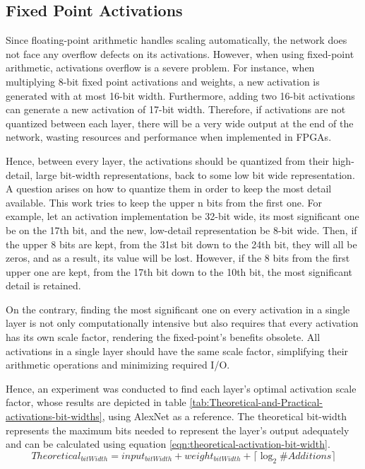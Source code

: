 \subsection{Fixed Point Activations}
\label{sec:Fixed-Point-Activations}
Since floating-point arithmetic handles scaling automatically, the network does not face any overflow defects on its activations. However, when using fixed-point arithmetic, activations overflow is a severe problem. For instance, when multiplying 8-bit fixed point activations and weights, a new activation is generated with at most 16-bit width. Furthermore, adding two 16-bit activations can generate a new activation of 17-bit width. Therefore, if activations are not quantized between each layer, there will be a very wide output at the end of the network, wasting resources and performance when implemented in FPGAs.

Hence, between every layer, the activations should be quantized from their high-detail, large bit-width representations, back to some low bit wide representation. A question arises on how to quantize them in order to keep the most detail available. This work tries to keep the upper n bits from the first one. For example, let an activation implementation be 32-bit wide, its most significant one be on the 17th bit, and the new, low-detail representation be 8-bit wide. Then, if the upper 8 bits are kept, from the 31st bit down to the 24th bit, they will all be zeros, and as a result, its value will be lost. However, if the 8 bits from the first upper one are kept, from the 17th bit down to the 10th bit, the most significant detail is retained.

On the contrary, finding the most significant one on every activation in a single layer is not only computationally intensive but also requires that every activation has its own scale factor, rendering the fixed-point's benefits obsolete. All activations in a single layer should have the same scale factor, simplifying their arithmetic operations and minimizing required I/O.

Hence, an experiment was conducted to find each layer's optimal activation scale factor, whose results are depicted in table \ref{tab:Theoretical-and-Practical-activations-bit-widths}, using AlexNet as a reference. The theoretical bit-width represents the maximum bits needed to represent the layer's output adequately and can be calculated using equation \ref{eqn:theoretical-activation-bit-width}.
\begin{equation}
	\label{eqn:theoretical-activation-bit-width}
	Theoretical_{bitWidth} = input_{bitWidth} + weight_{bitWidth} + \lceil \log_2 \#Additions \rceil
\end{equation}

